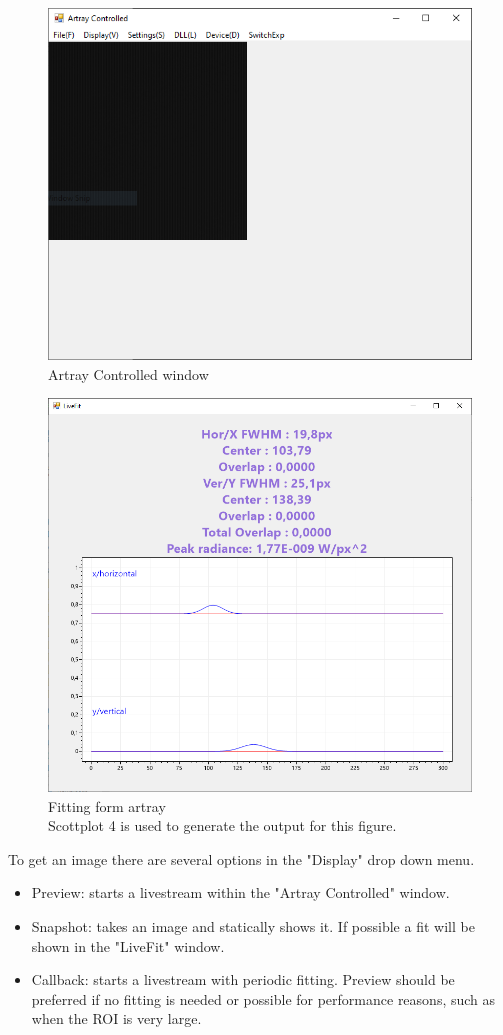 \documentclass[twoside,openright]{scrreprt}
\begin{document}
\begin{figure}[hbtp]
\centering
\includegraphics[width = 0.6\linewidth]{images/ArtrayExamplePics/ArtrayControlledMain.PNG}
\caption{Artray Controlled window\label{fig:ArtrayMain}}
\end{figure}

\begin{figure}[hbtp]
\centering
\includegraphics[width = 0.6\linewidth]{images/ArtrayExamplePics/FittingForm.PNG}
\caption{Fitting form artray\\Scottplot 4 is used to generate the output for this figure.\label{fig:ArtrayFitting}}
\end{figure}


To get an image there are several options in the "Display" drop down menu.
\begin{itemize}
\item Preview: starts a livestream within the "Artray Controlled" window.
\item Snapshot: takes an image and statically shows it. If possible a fit will be shown in the "LiveFit" window.
\item Callback: starts a livestream with periodic fitting. Preview should be preferred if no fitting is needed or possible for performance reasons, such as when the ROI is very large.
\end{itemize}
\end{document}
